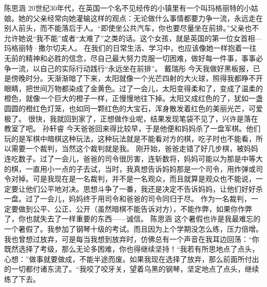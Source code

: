 \markdownRendererDocumentBegin
{}\markdownRendererInterblockSeparator
{}\markdownRendererInterblockSeparator
{}陈思涵\markdownRendererInterblockSeparator
{}20世纪30年代，在英国一个名不见经传的小镇里有一个叫玛格丽特的小姑娘。她的父亲经常向她灌输这样的观点：无论做什么事情都要力争一流，永远走在别人前头，而不能落后于人。“即使坐公共汽车，你也要尽量坐在前排。”父亲也不允许她说“我不能”或者“太难了”之类的话。这个女孩，就是英国的第一位女首相—玛格丽特·撒尔切夫人。\markdownRendererInterblockSeparator
{}在我们的日常生活、学习中，也应该像她一样抱着一往无前的精神和必胜的信念，尽自己最大努力克服一切困难，做好每一件事，事事必争一流，以自己的实际行动践行“永远坐在前排”。\markdownRendererInterblockSeparator
{}\markdownRendererInterblockSeparator
{}戴瑞彤\markdownRendererInterblockSeparator
{}今天我做好黑板报，已是傍晚时分。天渐渐暗了下来，太阳就像一个光芒四射的大火球，照得我都睁不开眼睛，把世间万物都染成了金黄色。过了一会儿，太阳变得柔和了，变成了温柔的橙色，就像一个巨大的橙子一样，正慢慢地往下掉。太阳又成红色的了，犹如一盏圆圆的橙红色灯笼，也如同一颗红色的大宝石，浑身散发着红色的美丽光芒，可爱极了。\markdownRendererInterblockSeparator
{}很快，我就回到家了，正想做作业呢，结果发现笔袋不见了，兴许是落在教室了吧。\markdownRendererInterblockSeparator
{}\markdownRendererInterblockSeparator
{}孙轩睿\markdownRendererInterblockSeparator
{}今天爸爸回来得比较早，于是他便和妈妈杀了一盘军棋。他们玩的是军棋中暗棋这种玩法，这种玩法就是不能看对方的棋，吃子时也不能看，所以需要一个裁判，当然这个裁判就是我。 刚开始，爸爸走错了好几步棋，被妈妈连吃数子。过了一会儿，爸爸的司令很厉害，连斩数将，妈妈可能以为那是中等大的棋，一直用小一点的子去试，当时，我真想告诉妈妈那是一个司令，用炸弹或司令对掉。可是我现在是一名裁判，并不是一名观众，而且就算是观众也不能说，一定要让他们公平地对决。思想斗争了一番，我还是决定不告诉妈妈，让他们好好杀一盘。过了一会儿，妈妈终于用司令和爸爸的司令同归于尽。 作为一名裁判，一定要做到公平、公正、公开（虽然暗棋不能告诉对方），不能作弊，如果你作弊了，你也就失去了一样重要的东西——诚信。 \markdownRendererInterblockSeparator
{}\markdownRendererInterblockSeparator
{}陈思涵\markdownRendererInterblockSeparator
{}这个暑假也许是我最难忘的一个暑假了。我参加了钢琴十级的考试。而且因为上个学期没怎么练，压力倍增。我也曾想过放弃，可是每当我想到放弃时，仿佛总有一个声音在我耳边回荡：“你既然选择了考级，那么无论多困难，你也得继续坚持！“我若有所思地点了点头，心想：”做事就要做成，不能半途而废。如果我现在选择了放弃，那么前面所付出的一切都付诸东流了。“我咬了咬牙关，望着乌黑的钢琴，坚定地点了点头，继续练了下去。\markdownRendererInterblockSeparator
